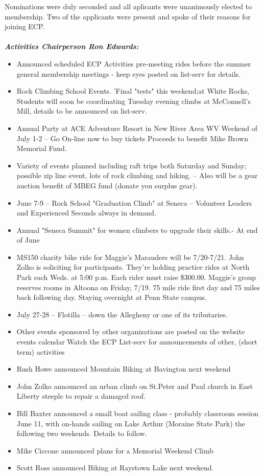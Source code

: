 \documentclass[10pt,a4paper]{article}
\begin{document}
\begin{multicols}{2}
Nominations were duly seconded and all aplicants were unanimously elected to membership. Two of the applicants were present and spoke of their reasons for joining ECP.\\
\\
\textit{\textbf{Activities Chairperson Ron Edwards: }} 
\begin{itemize}
\item Announced scheduled ECP Activities pre-meeting rides before the summer general membership meetings - keep eyes posted on list-serv for details.
\item Rock Climbing School Events.  'Final "tests" this weekend;at White Rocks, Students will soon be coordinating Tuesday evening climbs at McConnell's Mill,   details to be announced on list-serv.
\item Annual Party at ACE Adventure Resort in New River Area WV  Weekend of July 1-2 – Go On-line now to buy tickets  Proceeds to benefit Mike Brown Memorial Fund.
\item Variety of events planned including raft trips both Saturday and Sunday; possible zip line event, lots of rock climbing and hiking. – Also will be a gear auction benefit of MBEG fund
(donate you surplus gear).
\item June 7-9 – Rock School "Graduation Climb" at Seneca – Volunteer Leaders and Experienced Seconds always in demand.
\item Annual "Seneca Summit" for women climbers to upgrade their skills.- At end of June
\item MS150 charity bike ride for Maggie's Marauders will be 7/20-7/21.  John Zolko is soliciting for participants. They're holding practice rides at North Park each Weds. at 5:00 p.m. Each rider must raise \$300.00. Maggie's group reserves rooms in Altoona on Friday, 7/19.  75 mile ride first day and 75 miles back following day. Staying overnight at Penn State campus.
\item July 27-28 – Flotilla – down the Allegheny or one of its tributaries.
\item Other events sponsored by other organizations are posted on the website events calendar
Watch the ECP List-serv for announcements of other, (short term) activities
\item Rush Howe announced  Mountain Biking at Bavington next weekend
\item John Zolko announced an urban climb on St.Peter and Paul church in East Liberty steeple to repair a damaged roof.
\item Bill Baxter announced a small boat sailing class -  probably classroom session June 11, with on-hands sailing on Lake Arthur  (Moraine State Park) the following two weekends. Details to follow.
\item Mike Ciccone announced plans for a Memorial Weekend Climb
\item Scott Ross announced Biking at Raystown Lake next weekend.
\end{itemize}


\end{multicols}
\end{document}
